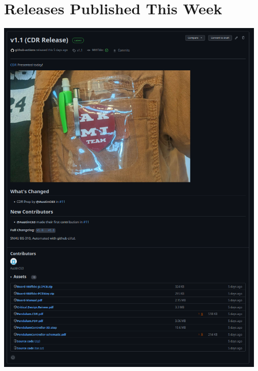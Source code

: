 \documentclass{scrartcl}
\begin{document}
\pagebreak
\section{Releases Published This Week}

\includegraphics[width=13cm]{v1.1}
\end{document}

